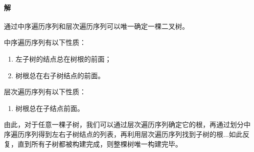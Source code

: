 \documentclass[11pt]{ctexrep}
\begin{document}
    \paragraph{解} 通过中序遍历序列和层次遍历序列可以唯一确定一棵二叉树。

    中序遍历序列有以下性质：

    \begin{enumerate}
        \item 左子树的结点总在树根的前面；
        \item 树根总在右子树结点的前面。
    \end{enumerate}

    层次遍历序列有以下性质：

    \begin{enumerate}
        \item 树根总在子结点前面。
    \end{enumerate}

    由此，对于任意一棵子树，我们可以通过层次遍历序列确定它的根，再通过划分中序遍历序列得到左右子树结点的列表，再利用层次遍历序列找到子树的根...如此反复，直到所有子树都被构建完成，则整棵树唯一构建完毕。
\end{document}

